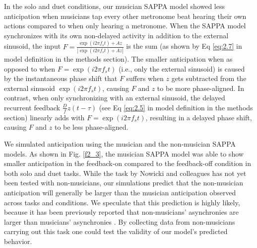 \documentclass{report}
\begin{document}
In the solo and duet conditions, our musician SAPPA model showed less anticipation when musicians tap every other metronome beat hearing their own actions compared to when only hearing a metronome. When the SAPPA model synchronizes with its own non-delayed activity in addition to the external sinusoid, the input $F = \frac{\exp(i2\pi f_s t)+Az}{|\exp(i2\pi f_s t)+Az|}$ is the sum (as shown by Eq \eqref{eq:2.7} in model definition in the methods section). The smaller anticipation when as opposed to when $F = \exp(i2\pi f_s t)$ (i.e., only the external sinusoid) is caused by the instantaneous phase shift that $F$ suffers when $z$ gets subtracted from the external sinusoid $\exp(i2\pi f_s t)$, causing $F$ and $z$ to be more phase-aligned. In contrast, when only synchronizing with an external sinusoid, the delayed recurrent feedback $\frac{D}{f}z(t-\tau)$ (see Eq \eqref{eq:2.5} in model definition in the methods section) linearly adds with $F = \exp(i2\pi f_s t)$, resulting in a delayed phase shift, causing $F$ and $z$ to be less phase-aligned.

We simulated anticipation using the musician and the non-musician SAPPA models. As shown in Fig.{} \ref{f2_3}, the musician SAPPA model was able to show smaller anticipation in the feedback-on compared to the feedback-off condition in both solo and duet tasks. While the task by Nowicki and colleagues \cite{nowicki2013mutual} has not yet been tested with non-musicians, our simulations predict that the non-musician anticipation will generally be larger than the musician anticipation observed across tasks and conditions. We speculate that this prediction is highly likely, because it has been previously reported that non-musicians' asynchronies are larger than musicians' asynchronies \cite{repp2007tapping}. By collecting data from non-musicians carrying out this task one could test the validity of our model's predicted behavior.
\end{document}
